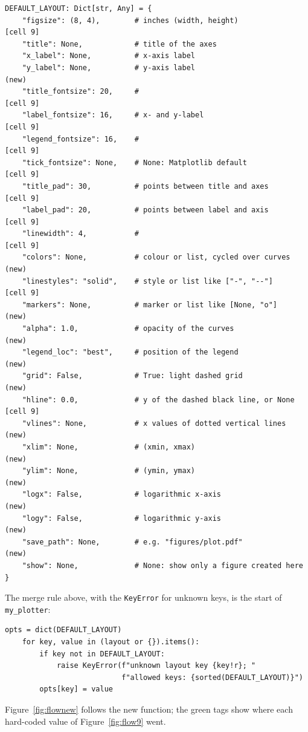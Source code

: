 \documentclass[11pt,a4paper]{article}
\newcommand{\src}[2]{\texttt{#1}, lines #2}
\begin{document}
\par\smallskip\noindent\begin{minipage}{\linewidth}\begin{lstlisting}[style=py,title={\src{plotter.py}{27--53}}]
DEFAULT_LAYOUT: Dict[str, Any] = {
    "figsize": (8, 4),        # inches (width, height)              [cell 9]
    "title": None,            # title of the axes
    "x_label": None,          # x-axis label
    "y_label": None,          # y-axis label                        (new)
    "title_fontsize": 20,     #                                     [cell 9]
    "label_fontsize": 16,     # x- and y-label                      [cell 9]
    "legend_fontsize": 16,    #                                     [cell 9]
    "tick_fontsize": None,    # None: Matplotlib default            [cell 9]
    "title_pad": 30,          # points between title and axes       [cell 9]
    "label_pad": 20,          # points between label and axis       [cell 9]
    "linewidth": 4,           #                                     [cell 9]
    "colors": None,           # colour or list, cycled over curves  (new)
    "linestyles": "solid",    # style or list like ["-", "--"]      [cell 9]
    "markers": None,          # marker or list like [None, "o"]     (new)
    "alpha": 1.0,             # opacity of the curves               (new)
    "legend_loc": "best",     # position of the legend              (new)
    "grid": False,            # True: light dashed grid             (new)
    "hline": 0.0,             # y of the dashed black line, or None [cell 9]
    "vlines": None,           # x values of dotted vertical lines   (new)
    "xlim": None,             # (xmin, xmax)                        (new)
    "ylim": None,             # (ymin, ymax)                        (new)
    "logx": False,            # logarithmic x-axis                  (new)
    "logy": False,            # logarithmic y-axis                  (new)
    "save_path": None,        # e.g. "figures/plot.pdf"             (new)
    "show": None,             # None: show only a figure created here
}
\end{lstlisting}\end{minipage}\par\smallskip
The merge rule above, with the \texttt{KeyError} for unknown keys, is the start of \texttt{my\_plotter}:
\par\smallskip\noindent\begin{minipage}{\linewidth}\begin{lstlisting}[style=py,title={\src{plotter.py}{77--82}}]
    opts = dict(DEFAULT_LAYOUT)
    for key, value in (layout or {}).items():
        if key not in DEFAULT_LAYOUT:
            raise KeyError(f"unknown layout key {key!r}; "
                           f"allowed keys: {sorted(DEFAULT_LAYOUT)}")
        opts[key] = value
\end{lstlisting}\end{minipage}\par\smallskip
Figure~\ref{fig:flownew} follows the new function; the green tags show where each hard-coded value of Figure~\ref{fig:flow9} went.
\end{document}

